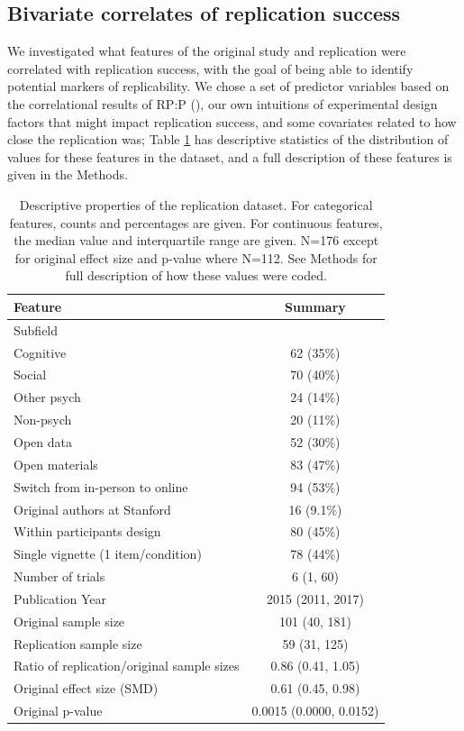 \documentclass[
  english,
  a4paper,
]{article}
\begin{document}
\subsection{Bivariate correlates of replication success}\label{bivariate-correlates-of-replication-success}

We investigated what features of the original study and replication were correlated with replication success, with the goal of being able to identify potential markers of replicability. We chose a set of predictor variables based on the correlational results of RP:P (), our own intuitions of experimental design factors that might impact replication success, and some covariates related to how close the replication was; Table \ref{tab:dist} has descriptive statistics of the distribution of values for these features in the dataset, and a full description of these features is given in the Methods.

\begin{table}[!h]
\centering
\caption{\label{tab:dist}Descriptive properties of the replication dataset. For categorical features, counts and percentages are given. For continuous features, the median value and interquartile range are given. N=176 except for original effect size and p-value where N=112. See Methods for full description of how these values were coded. }
\centering
\fontsize{10}{12}\selectfont
\begin{tabular}[t]{lc}
\toprule
Feature & Summary\\
\midrule
Subfield & \\
\hspace{1em}Cognitive & 62 (35\%)\\
\hspace{1em}Social & 70 (40\%)\\
\hspace{1em}Other psych & 24 (14\%)\\
\hspace{1em}Non-psych & 20 (11\%)\\
Open data & 52 (30\%)\\
Open materials & 83 (47\%)\\
Switch from in-person to online & 94 (53\%)\\
Original authors at Stanford & 16 (9.1\%)\\
Within participants design & 80 (45\%)\\
Single vignette (1 item/condition) & 78 (44\%)\\
Number of trials & 6 (1, 60)\\
Publication Year & 2015 (2011, 2017)\\
Original sample size & 101 (40, 181)\\
Replication sample size & 59 (31, 125)\\
Ratio of replication/original sample sizes & 0.86 (0.41, 1.05)\\
Original effect size (SMD) & 0.61 (0.45, 0.98)\\
Original p-value & 0.0015 (0.0000, 0.0152)\\
\bottomrule
\end{tabular}
\end{table}
\end{document}

